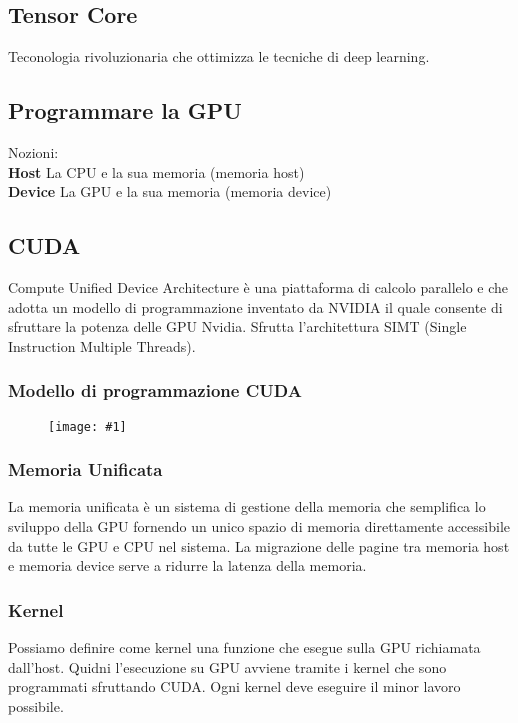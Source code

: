 \documentclass[8pt,a4paper]{article}
\newcommand{\f}[1]{
      \begin{figure}[H]
        \center
      \texttt{[image: \#1]}
      \end{figure}
}
\begin{document}
\begin{multicols}{5}
    \subsection{Tensor Core}
    Teconologia rivoluzionaria che ottimizza le tecniche di deep learning.
    \subsection{Programmare la GPU}
    Nozioni: \\
    \textbf{Host} La CPU e la sua memoria (memoria host) \\
    \textbf{Device} La GPU e la sua memoria (memoria device)

    \subsection{CUDA}
    Compute Unified Device Architecture è una piattaforma di calcolo parallelo e che 
    adotta un modello di programmazione inventato da NVIDIA il quale consente di 
    sfruttare la potenza delle GPU Nvidia. Sfrutta l'architettura SIMT (Single
    Instruction Multiple Threads).
    \subsubsection{Modello di programmazione CUDA}
    \f{cuda-flow}
    \subsubsection{Memoria Unificata}
    La memoria unificata è un sistema di gestione della memoria che semplifica lo 
    sviluppo della GPU fornendo un unico spazio di memoria direttamente accessibile 
    da tutte le GPU e CPU nel sistema. La migrazione delle pagine tra memoria host
    e memoria device serve a ridurre la latenza della memoria.
    \subsubsection{Kernel}
    Possiamo definire come kernel una funzione che esegue sulla GPU richiamata 
    dall’host. Quidni l’esecuzione su GPU avviene tramite i kernel che sono 
    programmati sfruttando CUDA. Ogni kernel deve eseguire il minor lavoro possibile. 

\end{multicols}
\end{document}
